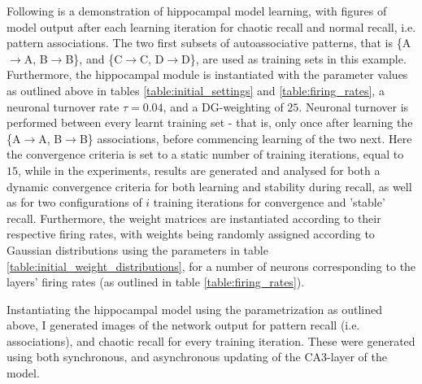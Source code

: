Following is a demonstration of hippocampal model learning, with figures of model output after each learning iteration for chaotic recall and normal recall, i.e. pattern associations. The two first subsets of autoassociative patterns, that is \{A$\rightarrow$A, B$\rightarrow$B\}, and \{C$\rightarrow$C, D$\rightarrow$D\}, are used as training sets in this example.
Furthermore, the hippocampal module is instantiated with the parameter values as outlined above in tables \ref{table:initial_settings} and \ref{table:firing_rates}, a neuronal turnover rate $\tau = 0.04$, and a DG-weighting of $25$. Neuronal turnover is performed between every learnt training set - that is, only once after learning the \{A$\rightarrow$A, B$\rightarrow$B\} associations, before commencing learning of the two next. Here the convergence criteria is set to a static number of training iterations, equal to $15$, while in the experiments, results are generated and analysed for both a dynamic convergence criteria for both learning and stability during recall, as well as for two configurations of $i$ training iterations for convergence and 'stable' recall. Furthermore, the weight matrices are instantiated according to their respective firing rates, with weights being randomly assigned according to Gaussian distributions using the parameters in table \ref{table:initial_weight_distributions}, for a number of neurons corresponding to the layers' firing rates (as outlined in table \ref{table:firing_rates}).

Instantiating the hippocampal model using the parametrization as outlined above, I generated images of the network output for pattern recall (i.e. associations), and chaotic recall for every training iteration. These were generated using both synchronous, and asynchronous updating of the CA3-layer of the model.

